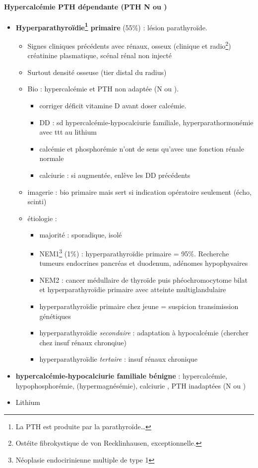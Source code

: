 \documentclass[11pt]{article}
\begin{document}
\paragraph{Hypercalcémie PTH dépendante (PTH N ou \inc)}
\label{sec:org40cf09f}
\begin{itemize}
\item \textbf{Hyperparathyroïdie\footnote{La PTH est produite par la parathyroïde\ldots{}} primaire} (55\%) : lésion parathyroïde. 
\begin{itemize}
\item Signes cliniques précédents avec rénaux, osseux (clinique et radio\footnote{Ostéite fibrokystique de von Recklinhausen, exceptionnelle.}) \thus créatinine
plasmatique, scénal rénal non injecté
\item Surtout densité osseuse (tier distal du radius)
\item Bio : hypercalcémie et PTH non adaptée (N ou \inc). 
\begin{itemize}
\item \danger corriger déficit vitamine D avant doser calcémie.
\item \danger DD : sd hypercalcémie-hypocalciurie familiale,
hyperparathormonémie avec ttt au lithium
\item calcémie et phosphorémie n'ont de sens qu'avec une fonction rénale normale
\item calciurie : si augmentée, enlève les DD précédents
\end{itemize}
\item imagerie : bio primaire mais sert si indication opératoire seulement (écho, scinti)
\item étiologie :
\begin{itemize}
\item majorité : sporadique, isolé
\item NEM1\footnote{Néoplasie endocirinienne multiple de type 1} (1\%) : hyperparathyroïdie primaire = 95\%. Recherche tumeurs
endocrines pancréas et duodenum, adénomes hypophysaires
\item NEM2 : cancer médullaire de thyroïde puis phéochromocytome bilat et
hyperparathyroïdie primaire avec atteinte multiglandulaire
\item \danger hyperparathyroïdie primaire chez jeune = suspicion transimission
génétiques
\item hyperparathyroïdie \emph{secondaire} : adaptation à hypocalcémie (chercher chez
insuf rénaux chronqiue)
\item hyperparathyroïdie \emph{tertaire} : insuf rénaux chronique
\end{itemize}
\end{itemize}
\item \textbf{hypercalcémie-hypocalciurie familiale bénigne} : hypercalcémie,
hypophosphorémie, (hypermagnésémie), calciurie \dec\dec{}, PTH inadaptées
(N ou \inc)
\item Lithium
\end{itemize}
\end{document}

